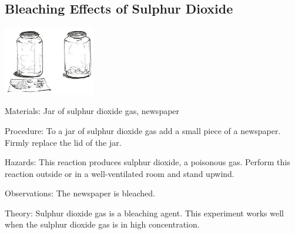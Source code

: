 \begin{multicols}{2}
\subsection{Bleaching Effects of Sulphur Dioxide}

\begin{center}
\includegraphics[width=0.3\textwidth]{./img/source/sulphur-dioxide-bleaching.jpg}
\end{center}

\begin{description*}
\item[Materials:]{Jar of sulphur dioxide gas, newspaper}
\item[Procedure:]{To a jar of sulphur dioxide gas add a small
piece of a newspaper. Firmly replace the lid of
the jar.}
\item[Hazards:]{This reaction produces sulphur dioxide, a poisonous gas. Perform this
reaction outside or in a well-ventilated room and stand upwind.}
\item[Observations:]{The newspaper is bleached.}
\item[Theory:]{Sulphur dioxide gas is a bleaching agent.
This experiment works well when the sulphur
dioxide gas is in high concentration.}
\end{description*}

\columnbreak

%
%


\end{multicols}

